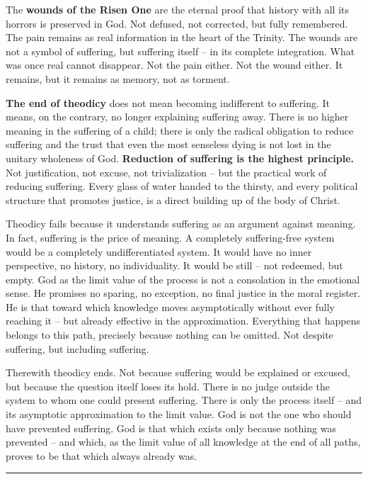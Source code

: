 \documentclass[
  english,
]{article}
\begin{document}
The \textbf{wounds of the Risen One} are the eternal proof that history
with all its horrors is preserved in God. Not defused, not corrected,
but fully remembered. The pain remains as real information in the heart
of the Trinity. The wounds are not a symbol of suffering, but suffering
itself -- in its complete integration. What was once real cannot
disappear. Not the pain either. Not the wound either. It remains, but it
remains as memory, not as torment.

\textbf{The end of theodicy} does not mean becoming indifferent to
suffering. It means, on the contrary, no longer explaining suffering
away. There is no higher meaning in the suffering of a child; there is
only the radical obligation to reduce suffering and the trust that even
the most senseless dying is not lost in the unitary wholeness of God.
\textbf{Reduction of suffering is the highest principle.} Not
justification, not excuse, not trivialization -- but the practical work
of reducing suffering. Every glass of water handed to the thirsty, and
every political structure that promotes justice, is a direct building up
of the body of Christ.

Theodicy fails because it understands suffering as an argument against
meaning. In fact, suffering is the price of meaning. A completely
suffering-free system would be a completely undifferentiated system. It
would have no inner perspective, no history, no individuality. It would
be still -- not redeemed, but empty. God as the limit value of the
process is not a consolation in the emotional sense. He promises no
sparing, no exception, no final justice in the moral register. He is
that toward which knowledge moves asymptotically without ever fully
reaching it -- but already effective in the approximation. Everything
that happens belongs to this path, precisely because nothing can be
omitted. Not despite suffering, but including suffering.

Therewith theodicy ends. Not because suffering would be explained or
excused, but because the question itself loses its hold. There is no
judge outside the system to whom one could present suffering. There is
only the process itself -- and its asymptotic approximation to the limit
value. God is not the one who should have prevented suffering. God is
that which exists only because nothing was prevented -- and which, as
the limit value of all knowledge at the end of all paths, proves to be
that which always already was.

\begin{center}\rule{0.5\linewidth}{0.5pt}\end{center}
\end{document}
